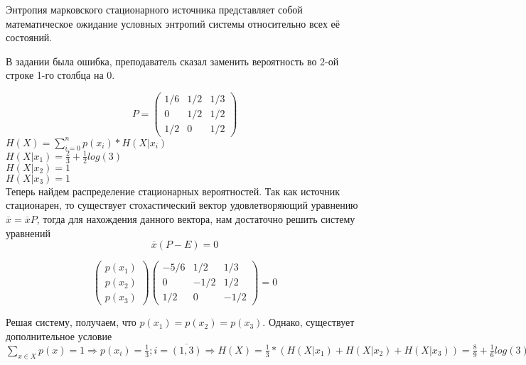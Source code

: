 \documentclass[../main.tex]{subfiles}
\begin{document}
Энтропия марковского стационарного источника представляет собой математическое ожидание условных энтропий системы относительно всех её состояний.

В задании была ошибка, преподаватель сказал заменить вероятность во 2-ой строке 1-го столбца на 0.

\begin{equation*}
P=
\left(
   \begin{array}{ccc}
     1/6 & 1/2 & 1/3 \\
     0   & 1/2 & 1/2 \\
     1/2 & 0   & 1/2
\end{array}
\right)
\end{equation*} 
$H(X) = \sum\limits_{i=0}^{n}p(x_i)*H(X|x_i)$ \\
$H(X|x_1) = \frac{2}{3} + \frac{1}{2}log(3)$ \\
$H(X|x_2) = 1$ \\
$H(X|x_3) = 1$ \\

Теперь найдем распределение стационарных вероятностей. Так как источник стационарен, то существует стохастический вектор удовлетворяющий уравнению $\overline{x}=\overline{x}P$, тогда для нахождения данного вектора, нам достаточно решить систему уравнений 
$$\overline{x}(P-E)=0$$ 

\begin{equation*} 
\left(
   \begin{array}{c}
     p(x_1)\\
     p(x_2)\\
     p(x_3)
\end{array}
\right) 
\left(
   \begin{array}{ccc}
     -5/6 & 1/2 & 1/3 \\
     0   & -1/2 & 1/2 \\
     1/2 & 0   & -1/2
\end{array}
\right) =0
\end{equation*}

Решая систему, получаем, что $p(x_1)=p(x_2)=p(x_3)$. Однако, существует дополнительное условие 
$\sum\limits_{x \in X}p(x) =1 \Rightarrow p(x_i)=\frac{1}{3}; i=\overline{(1,3)} \Rightarrow H(X) = \frac{1}{3}*(H(X|x_1)+H(X|x_2)+H(X|x_3)) = \frac{8}{9}+\frac{1}{6}log(3)$
\end{document}
